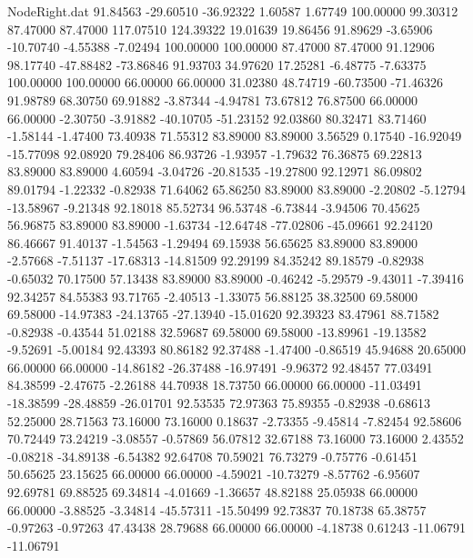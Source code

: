 \begin{filecontents}{NodeRight.dat}
  91.84563  -29.60510  -36.92322     1.60587    1.67749  100.00000   99.30312   87.47000   87.47000  117.07510  124.39322   19.01639   19.86456
  91.89629   -3.65906  -10.70740    -4.55388   -7.02494  100.00000  100.00000   87.47000   87.47000   91.12906   98.17740  -47.88482  -73.86846
  91.93703   34.97620   17.25281    -6.48775   -7.63375  100.00000  100.00000   66.00000   66.00000   31.02380   48.74719  -60.73500  -71.46326
  91.98789   68.30750   69.91882    -3.87344   -4.94781   73.67812   76.87500   66.00000   66.00000   -2.30750   -3.91882  -40.10705  -51.23152
  92.03860   80.32471   83.71460    -1.58144   -1.47400   73.40938   71.55312   83.89000   83.89000    3.56529    0.17540  -16.92049  -15.77098
  92.08920   79.28406   86.93726    -1.93957   -1.79632   76.36875   69.22813   83.89000   83.89000    4.60594   -3.04726  -20.81535  -19.27800
  92.12971   86.09802   89.01794    -1.22332   -0.82938   71.64062   65.86250   83.89000   83.89000   -2.20802   -5.12794  -13.58967   -9.21348
  92.18018   85.52734   96.53748    -6.73844   -3.94506   70.45625   56.96875   83.89000   83.89000   -1.63734  -12.64748  -77.02806  -45.09661
  92.24120   86.46667   91.40137    -1.54563   -1.29494   69.15938   56.65625   83.89000   83.89000   -2.57668   -7.51137  -17.68313  -14.81509
  92.29199   84.35242   89.18579    -0.82938   -0.65032   70.17500   57.13438   83.89000   83.89000   -0.46242   -5.29579   -9.43011   -7.39416
  92.34257   84.55383   93.71765    -2.40513   -1.33075   56.88125   38.32500   69.58000   69.58000  -14.97383  -24.13765  -27.13940  -15.01620
  92.39323   83.47961   88.71582    -0.82938   -0.43544   51.02188   32.59687   69.58000   69.58000  -13.89961  -19.13582   -9.52691   -5.00184
  92.43393   80.86182   92.37488    -1.47400   -0.86519   45.94688   20.65000   66.00000   66.00000  -14.86182  -26.37488  -16.97491   -9.96372
  92.48457   77.03491   84.38599    -2.47675   -2.26188   44.70938   18.73750   66.00000   66.00000  -11.03491  -18.38599  -28.48859  -26.01701
  92.53535   72.97363   75.89355    -0.82938   -0.68613   52.25000   28.71563   73.16000   73.16000    0.18637   -2.73355   -9.45814   -7.82454
  92.58606   70.72449   73.24219    -3.08557   -0.57869   56.07812   32.67188   73.16000   73.16000    2.43552   -0.08218  -34.89138   -6.54382
  92.64708   70.59021   76.73279    -0.75776   -0.61451   50.65625   23.15625   66.00000   66.00000   -4.59021  -10.73279   -8.57762   -6.95607
  92.69781   69.88525   69.34814    -4.01669   -1.36657   48.82188   25.05938   66.00000   66.00000   -3.88525   -3.34814  -45.57311  -15.50499
  92.73837   70.18738   65.38757    -0.97263   -0.97263   47.43438   28.79688   66.00000   66.00000   -4.18738    0.61243  -11.06791  -11.06791

\end{filecontents}
